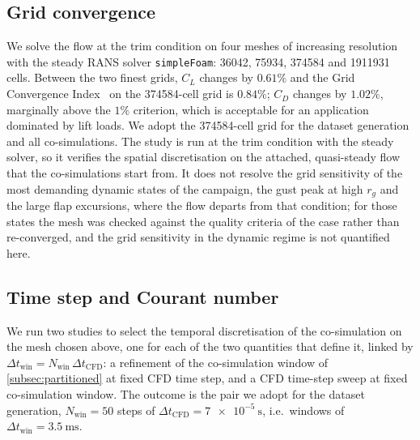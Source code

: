 \subsection{Grid convergence}
\label{subsubsec:grid_convergence}
We solve the flow at the trim condition on four meshes of increasing resolution with the steady RANS solver \texttt{simpleFoam}: \num{36042}, \num{75934}, \num{374584} and \num{1911931} cells. Between the two finest grids, $C_L$ changes by $0.61\%$ and the Grid Convergence Index~\cite{celik2008procedure} on the \num{374584}-cell grid is $0.84\%$; $C_D$ changes by $1.02\%$, marginally above the $1\%$ criterion, which is acceptable for an application dominated by lift loads. We adopt the \num{374584}-cell grid for the dataset generation and all co-simulations. The study is run at the trim condition with the steady solver, so it verifies the spatial discretisation on the attached, quasi-steady flow that the co-simulations start from. It does not resolve the grid sensitivity of the most demanding dynamic states of the campaign, the gust peak at high $r_g$ and the large flap excursions, where the flow departs from that condition; for those states the mesh was checked against the quality criteria of the case rather than re-converged, and the grid sensitivity in the dynamic regime is not quantified here.

\subsection{Time step and Courant number}
\label{subsubsec:temporal}
We run two studies to select the temporal discretisation of the co-simulation on the mesh chosen above, one for each of the two quantities that define it, linked by $\Delta t_{\mathrm{win}} = N_{\mathrm{win}}\,\Delta t_{\mathrm{CFD}}$: a refinement of the co-simulation window of \cref{subsec:partitioned} at fixed CFD time step, and a CFD time-step sweep at fixed co-simulation window. The outcome is the pair we adopt for the dataset generation, $N_{\mathrm{win}} = 50$ steps of $\Delta t_{\mathrm{CFD}} = \SI{7e-5}{\second}$, i.e.\ windows of $\Delta t_{\mathrm{win}} = \SI{3.5}{\milli\second}$.

